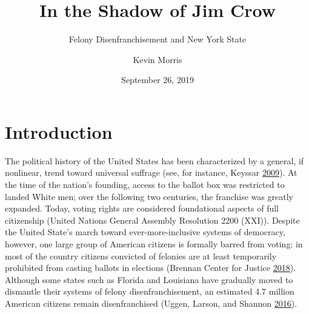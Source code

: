 \documentclass[12pt,]{article}
\title{In the Shadow of Jim Crow}
\subtitle{Felony Disenfranchisement and New York State}
\author{Kevin Morris}
\date{September 26, 2019}
\begin{document}
\maketitle


\tableofcontents
\pagebreak


\hypertarget{introduction}{%
\section{Introduction}\label{introduction}}

The political history of the United States has been characterized by a general, if nonlinear, trend toward universal suffrage (see, for instance, Keyssar \protect\hyperlink{ref-Keyssar2009}{2009}). At the time of the nation's founding, access to the ballot box was restricted to landed White men; over the following two centuries, the franchise was greatly expanded. Today, voting rights are considered foundational aspects of full citizenship (United Nations General Assembly Resolution 2200 (XXI)). Despite the United State's march toward ever-more-inclusive systems of democracy, however, one large group of American citizens is formally barred from voting: in most of the country citizens convicted of felonies are at least temporarily prohibited from casting ballots in elections (Brennan Center for Justice \protect\hyperlink{ref-bcj_laws}{2018}). Although some states such as Florida and Louisiana have gradually moved to dismantle their systems of felony disenfranchisement, an estimated 4.7 million American citizens remain disenfranchised (Uggen, Larson, and Shannon \protect\hyperlink{ref-sentencing_2016}{2016}).
\end{document}
